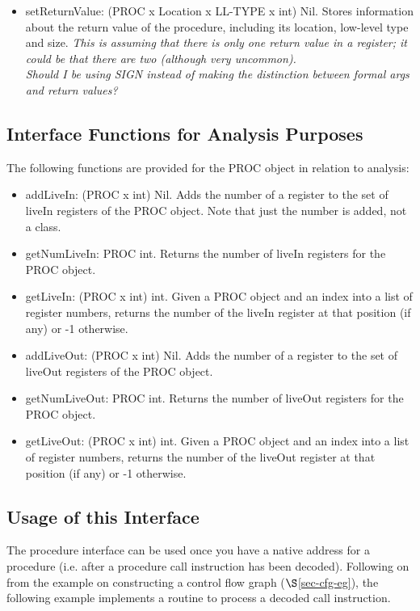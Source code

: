 \begin{itemize}
\item setReturnValue: (PROC x Location x LL-TYPE x int) \ra Nil.
    Stores information about the return value of the procedure,
    including its location, low-level type and size.
    {\it This is assuming that there is only one return value in
    a register; it could be that there are two (although very
    uncommon). }  \\
    \emph{Should I be using SIGN instead of making the distinction
    between formal args and return values?}
\end{itemize}


\subsection{Interface Functions for Analysis Purposes}
The following functions are provided for the PROC object in
relation to analysis:

\begin{itemize}
\item addLiveIn: (PROC x int) \ra Nil.
    Adds the number of a register to the set of liveIn registers of the
    PROC object. Note that just the number is added, not a class.

\item getNumLiveIn: PROC \ra int.
    Returns the number of liveIn registers for the PROC object.

\item getLiveIn: (PROC x int) \ra int.
    Given a PROC object and an index into a list of register numbers,
    returns the number of the liveIn register at that position
    (if any) or -1 otherwise.

\item addLiveOut: (PROC x int) \ra Nil. 
    Adds the number of a register to the set of liveOut registers
    of the PROC object.

\item getNumLiveOut: PROC \ra int.
    Returns the number of liveOut registers for the PROC object.

\item getLiveOut: (PROC x int) \ra int.
    Given a PROC object and an index into a list of register numbers,
    returns the number of the liveOut register at that position
    (if any) or -1 otherwise.
\end{itemize}


\subsection{Usage of this Interface}
\label{sec-proc-eg}
The procedure interface can be used once you have a native
address for a procedure (i.e. after a procedure call instruction
has been decoded).  
Following on from the example on constructing a control flow 
graph ($\S$\ref{sec-cfg-eg}), the following example implements a 
routine to process a decoded call instruction.  

